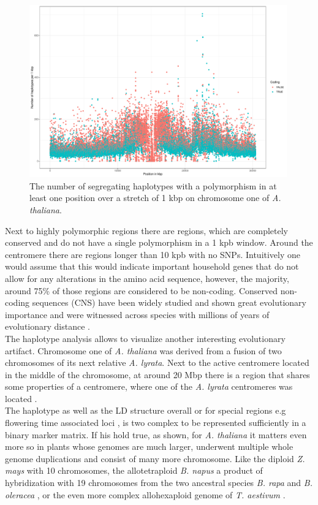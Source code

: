 \begin{figure}[H]
\centering 
\includegraphics[height=.55\textheight, width=0.99\textwidth]{Figures/chr1_hap}
\decoRule
\caption[Haplotype strutcture of chromosome 1 of \textit{A. thaliana}]{The number of
  segregating haplotypes with a polymorphism in at least one position over a stretch of 1
  kbp on chromosome one of \textit{A. thaliana}.}
\label{fig:chr1}
\end{figure}

Next to highly polymorphic regions there are regions, which are completely conserved and
do not have a single polymorphism in a 1 kpb window. Around the centromere there are
regions longer than 10 kpb with no SNPs. Intuitively one would assume that this would
indicate important household genes that do not allow for any alterations in the amino acid
sequence, however, the majority, around 75\% of those regions are considered to be
non-coding. Conserved non-coding sequences (CNS) have been widely studied and shown great
evolutionary importance and were witnessed across species with millions of years of
evolutionary distance \cite{Burgess946}. \\
The haplotype analysis allows to visualize another interesting evolutionary
artifact. Chromosome one of \textit{A. thaliana} was derived from a fusion of two
chromosomes of its next relative \textit{A. lyrata}. Next to the active centromere located
in the middle of the chromosome, at around 20 Mbp there is a region that shares some
properties of a centromere, where one of the \textit{A. lyrata} centromeres was
located \cite{koch2007evolution}. \\
The haplotype as well as the LD structure overall or for special regions e.g flowering
time associated loci \cite{li2014multiple}, is two complex to be represented sufficiently
in a binary marker matrix. If his hold true, as shown, for \textit{A. thaliana} it matters
even more so in plants whose genomes are much larger, underwent multiple whole genome
duplications and consist of many more chromosome. Like the diploid \textit{Z. mays} with
10 chromosomes, the allotetraploid \textit{B. napus} a product of hybridization with 19
chromosomes from the two ancestral species \textit{B. rapa} and \textit{B. oleracea}
\cite{liu2018brassica}, or the even more complex allohexaploid genome of
\textit{T. aestivum} \cite{international2018shifting}.

